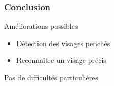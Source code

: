 \documentclass{beamer}
\begin{document}
	
	\begin{frame}
	\frametitle{Conclusion}
	\begin{alertblock}{Améliorations possibles}
   	\rightskip=0pt\leftskip=0pt
	\begin{itemize}
		\item Détection des visages penchés 
		\item Reconnaître un visage précis
	\end{itemize}
	\end{alertblock}
	\begin{alertblock}{Pas de difficultés particulières}
   	\rightskip=0pt\leftskip=0pt
	\end{alertblock}	
	\end{frame}
\end{document}
